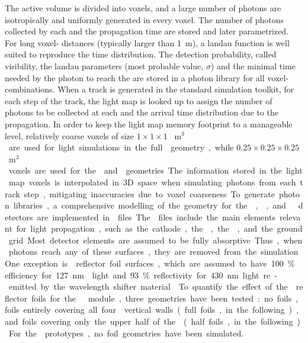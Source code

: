 The active volume is divided into voxels, and a large number of photons are isotropically and uniformly generated in every voxel. The number of photons collected by each  and the propagation time are stored and later parametrized. For long voxel- distances (typically larger than \SI{1}{\m}), a landau function is well suited to reproduce the time distribution. The detection probability, called visibility, the landau parameters (most probable value, $\sigma$) and the minimal time needed by the photon to reach the  are stored in a photon library for all voxel- combinations. When a track is generated in the standard \dual {} simulation toolkit, for each step of the track, the light map is looked up to assign the number of photons to be collected at each  and the arrival time distribution due to the propagation. In order to keep the light map memory footprint to a manageable level, relatively coarse voxels of size $1\times 1\times 1$ \SI{}{m$^3$} are used for light simulations in the full  geometry, while $0.25\times 0.25\times 0.25$ \SI{}{m$^3$} voxels are used for the  and  geometries. The information stored in the light map voxels is interpolated in 3D space when simulating photons from each track step,  mitigating inaccuracies due to voxel coarseness.

To generate photon libraries, a comprehensive modelling of the geometry for the , , and   detectors are implemented in  files. The  files include the main elements relevant for light propagation, such as the cathode, the , the , and the ground grid. Most detector elements are assumed to be fully absorptive. Thus, when photons reach any of these surfaces, they are removed from the simulation. One exception is  reflector foil surfaces, which are assumed to have \SI{100}{\%}  efficiency for \SI{127}{\nm}  light and 93\% reflectivity for \SI{430}{\nm} light re-emitted by the wavelength shifter material \cite{Francini:2013lua}. To quantify the effect of the  reflector foils for the   module, three geometries have been tested: no foils, foils entirely covering all four  vertical walls (full foils, in the following), and foils covering only the upper half of the  (half foils, in the following). For the  prototypes, no foil geometries have been simulated.

